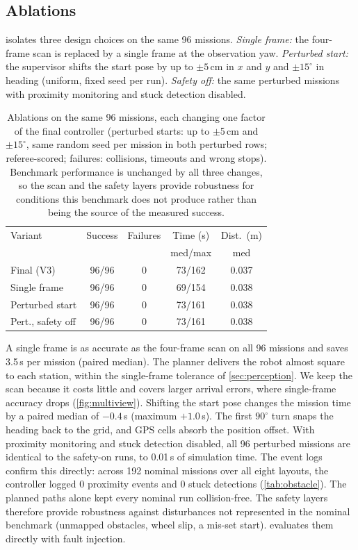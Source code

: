 \subsection{Ablations}
 isolates three design choices on the same 96 missions. \emph{Single frame:} the four-frame scan is replaced by a single frame at the observation yaw. \emph{Perturbed start:} the supervisor shifts the start pose by up to $\pm5$\,cm in $x$ and $y$ and $\pm15^\circ$ in heading (uniform, fixed seed per run). \emph{Safety off:} the same perturbed missions with proximity monitoring and stuck detection disabled.

\begin{table}[tbp]
  \centering\small
  \setlength{\tabcolsep}{4pt}
  \begin{tabular}{@{}lcccc@{}}
    \toprule
    Variant & Success & Failures & Time (s) & Dist.\ (m) \\
            &         &          & med/max  & med \\
    \midrule
    Final (V3)        & 96/96 & 0 & 73/162 & 0.037 \\
    Single frame      & 96/96 & 0 & 69/154 & 0.038 \\
    Perturbed start   & 96/96 & 0 & 73/161 & 0.038 \\
    Pert., safety off & 96/96 & 0 & 73/161 & 0.038 \\
    \bottomrule
  \end{tabular}
  \caption{Ablations on the same 96 missions, each changing one factor of the final controller (perturbed starts: up to $\pm$5\,cm and $\pm15^\circ$, same random seed per mission in both perturbed rows; referee-scored; failures: collisions, timeouts and wrong stops). Benchmark performance is unchanged by all three changes, so the scan and the safety layers provide robustness for conditions this benchmark does not produce rather than being the source of the measured success.}
  \label{tab:ablation}
\end{table}

A single frame is as accurate as the four-frame scan on all 96 missions and saves 3.5\,s per mission (paired median). The planner delivers the robot almost square to each station, within the single-frame tolerance of \cref{sec:perception}. We keep the scan because it costs little and covers larger arrival errors, where single-frame accuracy drops (\cref{fig:multiview}).
Shifting the start pose changes the mission time by a paired median of $-0.4$\,s (maximum $+1.0$\,s). The first $90^\circ$ turn snaps the heading back to the grid, and GPS cells absorb the position offset.
With proximity monitoring and stuck detection disabled, all 96 perturbed missions are identical to the safety-on runs, to 0.01\,s of simulation time. The event logs confirm this directly: across 192 nominal missions over all eight layouts, the controller logged 0 proximity events and 0 stuck detections (\cref{tab:obstacle}). The planned paths alone kept every nominal run collision-free. The safety layers therefore provide robustness against disturbances not represented in the nominal benchmark (unmapped obstacles, wheel slip, a mis-set start).  evaluates them directly with fault injection.

